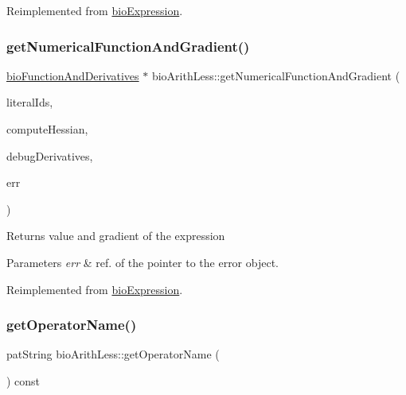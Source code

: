 Reimplemented from \hyperlink{classbio_expression_a3e4b4dca58dbbc6f0e411b30eb3f60b4}{bio\+Expression}.

\mbox{\label{classbio_arith_less_a03309258107a65a08f59b00878eec548}} 
\subsubsection{\texorpdfstring{get\+Numerical\+Function\+And\+Gradient()}{getNumericalFunctionAndGradient()}}
{\footnotesize\ttfamily \hyperlink{classbio_function_and_derivatives}{bio\+Function\+And\+Derivatives} $\ast$ bio\+Arith\+Less\+::get\+Numerical\+Function\+And\+Gradient (\begin{DoxyParamCaption}\item[{vector$<$ pat\+U\+Long $>$}]{literal\+Ids,  }\item[{pat\+Boolean}]{compute\+Hessian,  }\item[{pat\+Boolean}]{debug\+Derivatives,  }\item[{pat\+Error $\ast$\&}]{err }\end{DoxyParamCaption})\hspace{0.3cm}{\ttfamily [virtual]}}

\begin{DoxyReturn}{Returns}
value and gradient of the expression 
\end{DoxyReturn}

\begin{DoxyParams}{Parameters}
{\em err} & ref. of the pointer to the error object. \\
\hline
\end{DoxyParams}


Reimplemented from \hyperlink{classbio_expression_a91c81ce80c9e972c913b10f5f3c1ed13}{bio\+Expression}.

\mbox{\label{classbio_arith_less_a0be270c31ac0cec7d6e23dfe9558a138}} 
\subsubsection{\texorpdfstring{get\+Operator\+Name()}{getOperatorName()}}
{\footnotesize\ttfamily pat\+String bio\+Arith\+Less\+::get\+Operator\+Name (\begin{DoxyParamCaption}{ }\end{DoxyParamCaption}) const\hspace{0.3cm}{\ttfamily [virtual]}}

